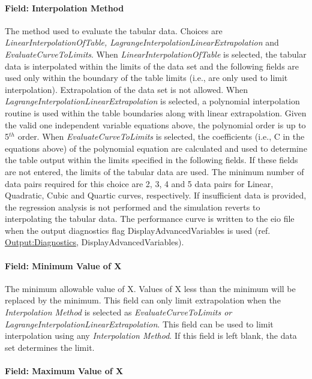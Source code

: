 \paragraph{Field: Interpolation Method}\label{field-interpolation-method}

The method used to evaluate the tabular data. Choices are \emph{LinearInterpolationOfTable, LagrangeInterpolationLinearExtrapolation} and \emph{EvaluateCurveToLimits}. When \emph{LinearInterpolationOfTable} is selected, the tabular data is interpolated within the limits of the data set and the following fields are used only within the boundary of the table limits (i.e., are only used to limit interpolation). Extrapolation of the data set is not allowed. When \emph{LagrangeInterpolationLinearExtrapolation} is selected, a polynomial interpolation routine is used within the table boundaries along with linear extrapolation. Given the valid one independent variable equations above, the polynomial order is up to 5\(^{th}\) order. When \emph{EvaluateCurveToLimits} is selected, the coefficients (i.e., C in the equations above) of the polynomial equation are calculated and used to determine the table output within the limits specified in the following fields. If these fields are not entered, the limits of the tabular data are used. The minimum number of data pairs required for this choice are 2, 3, 4 and 5 data pairs for Linear, Quadratic, Cubic and Quartic curves, respectively. If insufficient data is provided, the regression analysis is not performed and the simulation reverts to interpolating the tabular data. The performance curve is written to the eio file when the output diagnostics flag DisplayAdvancedVariables is used (ref. \hyperref[outputdiagnostics]{Output:Diagnostics}, DisplayAdvancedVariables).

\paragraph{Field: Minimum Value of X}\label{field-minimum-value-of-x-000}

The minimum allowable value of X. Values of X less than the minimum will be replaced by the minimum. This field can only limit extrapolation when the \emph{Interpolation Method} is selected as \emph{EvaluateCurveToLimits or LagrangeInterpolationLinearExtrapolation}. This field can be used to limit interpolation using any \emph{Interpolation Method}. If this field is left blank, the data set determines the limit.

\paragraph{Field: Maximum Value of X}\label{field-maximum-value-of-x-000}

